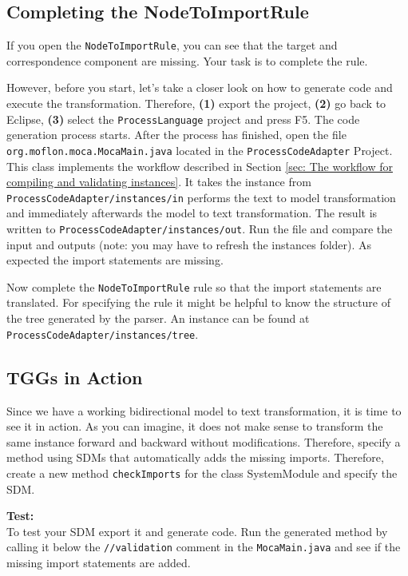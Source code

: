 \subsection{Completing the NodeToImportRule}

If you open the \texttt{NodeToImportRule}, you can see that the target and correspondence component are missing. 
Your task is to complete the rule.  


However, before you start, let's take a closer look on how to generate code and execute the transformation. 
Therefore, \textbf{(1)} export the project, \textbf{(2)} go back to Eclipse, \textbf{(3)} select the \texttt{ProcessLanguage} project and press F5. The code generation process starts. 
After the process has finished, open the file \texttt{org.moflon.moca.MocaMain.java} located in the \texttt{ProcessCodeAdapter} Project. 
This class implements the workflow described in Section \ref{sec: The workflow for compiling and validating instances}. 
It takes the instance from \texttt{ProcessCodeAdapter/instances/in} performs the text to model transformation and immediately afterwards the model to text transformation. The result is written to \texttt{ProcessCodeAdapter/instances/out}. 
Run the file and compare the input and outputs (note: you may have to refresh the instances folder). 
As expected the import statements are missing. 


Now complete the \texttt{NodeToImportRule} rule so that the import statements are translated.
For specifying the rule it might be helpful to know the structure of the tree generated by the parser. An instance can be found at \texttt{ProcessCodeAdapter/instances/tree}.

\subsection{TGGs in Action}
Since we have a working bidirectional model to text transformation, it is time to see it in action.
As you can imagine, it does not make sense to transform the same instance forward and backward without modifications. Therefore, specify a method using SDMs that automatically adds the missing imports.   
Therefore, create a new method \texttt{checkImports} for the class SystemModule and specify the SDM. 
 
\textbf{Test:}\\
To test your SDM export it and generate code.
Run the generated method by calling it below the \texttt{//validation} comment in the \texttt{MocaMain.java} and see if the missing import statements are added. 








